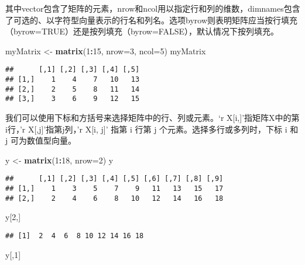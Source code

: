 \documentclass[]{book}
\newenvironment{Shaded}{\begin{snugshade}}{\end{snugshade}}
\newcommand{\DataTypeTok}[1]{\textcolor[rgb]{0.13,0.29,0.53}{#1}}
\newcommand{\DecValTok}[1]{\textcolor[rgb]{0.00,0.00,0.81}{#1}}
\newcommand{\KeywordTok}[1]{\textcolor[rgb]{0.13,0.29,0.53}{\textbf{#1}}}
\newcommand{\NormalTok}[1]{#1}
\newcommand{\OperatorTok}[1]{\textcolor[rgb]{0.81,0.36,0.00}{\textbf{#1}}}
\newcommand{\StringTok}[1]{\textcolor[rgb]{0.31,0.60,0.02}{#1}}
\begin{document}
其中vector包含了矩阵的元素，nrow和ncol用以指定行和列的维数，dimnames包含了可选的、以字符型向量表示的行名和列名。选项byrow则表明矩阵应当按行填充（byrow=TRUE）还是按列填充（byrow=FALSE），默认情况下按列填充。

\begin{Shaded}
\begin{Highlighting}[]
\NormalTok{myMatrix <-}\StringTok{ }\KeywordTok{matrix}\NormalTok{(}\DecValTok{1}\OperatorTok{:}\DecValTok{15}\NormalTok{, }\DataTypeTok{nrow=}\DecValTok{3}\NormalTok{, }\DataTypeTok{ncol=}\DecValTok{5}\NormalTok{)  }
\NormalTok{myMatrix}
\end{Highlighting}
\end{Shaded}

\begin{verbatim}
##      [,1] [,2] [,3] [,4] [,5]
## [1,]    1    4    7   10   13
## [2,]    2    5    8   11   14
## [3,]    3    6    9   12   15
\end{verbatim}

我们可以使用下标和方括号来选择矩阵中的行、列或元素。`r
X{[}i,{]}'指矩阵X中的第i行，'r X{[},j{]}'指第j列，'r X{[}i, j{]}' 指第 i
行第 j 个元素。选择多行或多列时，下标 i 和 j 可为数值型向量。

\begin{Shaded}
\begin{Highlighting}[]
\NormalTok{y <-}\StringTok{ }\KeywordTok{matrix}\NormalTok{(}\DecValTok{1}\OperatorTok{:}\DecValTok{18}\NormalTok{, }\DataTypeTok{nrow=}\DecValTok{2}\NormalTok{)}
\NormalTok{y}
\end{Highlighting}
\end{Shaded}

\begin{verbatim}
##      [,1] [,2] [,3] [,4] [,5] [,6] [,7] [,8] [,9]
## [1,]    1    3    5    7    9   11   13   15   17
## [2,]    2    4    6    8   10   12   14   16   18
\end{verbatim}

\begin{Shaded}
\begin{Highlighting}[]
\NormalTok{y[}\DecValTok{2}\NormalTok{,]}
\end{Highlighting}
\end{Shaded}

\begin{verbatim}
## [1]  2  4  6  8 10 12 14 16 18
\end{verbatim}

\begin{Shaded}
\begin{Highlighting}[]
\NormalTok{y[,}\DecValTok{1}\NormalTok{]}
\end{Highlighting}
\end{Shaded}
\end{document}
